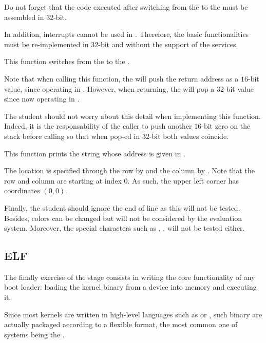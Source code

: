 Do not forget that the code executed after switching from the 
to the  must be assembled in 32-bit.

In addition,  interrupts cannot be used in .
Therefore, the basic functionalities must be re-implemented in $32$-bit and
without the support of the  services.

{
  This function switches from the  to the .

  \-

  Note that when calling this function, the  will push the return
  address as a $16$-bit value, since operating in . However,
  when returning, the  will pop a $32$-bit value since now operating
  in .

  \-

  The student should not worry about this detail when implementing this
  function. Indeed, it is the responsability of the caller to push another
  $16$-bit zero on the stack before calling so that when pop-ed in $32$-bit
  both values coincide.
}

{
  This function prints the string whose address is given in .

  \-

  The location is specified through the row by  and the
  column by . Note that the row and column are starting at
  index 0. As such, the upper left corner has coordinates $(0,0)$.

  \-

  Finally, the student should ignore the end of line as this will not be
  tested. Besides, colors can be changed but will not be considered by
  the evaluation system. Moreover, the special characters such as ,
  ,  \etc{} will not be tested either.
}

\subsection{ELF}

The finally exercise of the  stage consists in writing the core
functionality of any boot loader: loading the kernel binary from a device
into memory and executing it.

Since most kernels are written in high-level languages such as  or
, such binary are actually packaged according to a flexible format,
the most common one of  systems being the .

